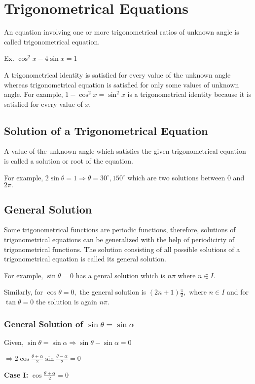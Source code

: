 \chapter{Trigonometrical Equations}
An equation involving one or more trigonometrical ratios of unknown angle is called trigonometrical equation.

Ex. $\cos^2x - 4\sin x = 1$

A trigonometrical identity is satisfied for every value of the unknown angle whereas trigonometrical equation is satisfied for
only some values of unknown angle. For example, $1 - \cos^2x = \sin^2x$ is a trigonometrical identity because it is satisfied
for every value of $x.$

\section{Solution of a Trigonometrical Equation}
A value of the unknown angle which satisfies the given trigonometrical equation is called a solution or root of the equation.

For example, $2\sin\theta = 1 \Rightarrow \theta = 30^\circ, 150^\circ$ which are two solutions between $0$ and
$2\pi.$

\section{General Solution}
Some trigonometrical functions are periodic functions, therefore, solutions of trigonometrical equations can be generalized with
the help of periodicirty of trigonometrical functions. The solution consisting of all possible solutions of a trigonometrical
equation is called its general solution.

For example, $\sin\theta = 0$ has a genral solution which is $n\pi$ where $n\in I.$

Similarly, for $\cos\theta = 0,$ the general solution is $(2n + 1)\frac{\pi}{2},$ where $n\in I$ and for
$\tan\theta = 0$ the solution is again $n\pi.$

\subsection{General Solution of $\sin\theta = \sin\alpha$}
Given, $\sin\theta = \sin\alpha \Rightarrow \sin\theta - \sin\alpha = 0$

$\Rightarrow 2\cos\frac{\theta + \alpha}{2}\sin\frac{\theta - \alpha}{2} = 0$

{\bf Case I:} $\cos\frac{\theta + \alpha}{2} = 0$

